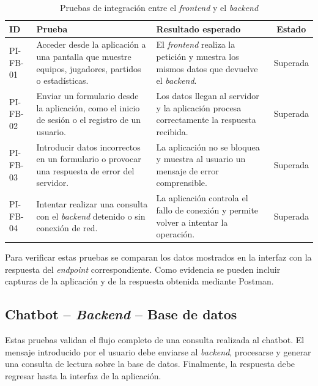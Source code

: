 \begin{table}[H]
    \centering
    \small
    \begin{tabularx}{\textwidth}{|l|X|X|c|}
        \hline
        \textbf{ID} & \textbf{Prueba} & \textbf{Resultado esperado} &
        \textbf{Estado} \\ \hline

        PI-FB-01 &
        Acceder desde la aplicación a una pantalla que muestre equipos,
        jugadores, partidos o estadísticas. &
        El \textit{frontend} realiza la petición y muestra los mismos datos que
        devuelve el \textit{backend}. &
        Superada \\ \hline

        PI-FB-02 &
        Enviar un formulario desde la aplicación, como el inicio de sesión o el
        registro de un usuario. &
        Los datos llegan al servidor y la aplicación procesa correctamente la
        respuesta recibida. &
        Superada \\ \hline

        PI-FB-03 &
        Introducir datos incorrectos en un formulario o provocar una respuesta
        de error del servidor. &
        La aplicación no se bloquea y muestra al usuario un mensaje de error
        comprensible. &
        Superada \\ \hline

        PI-FB-04 &
        Intentar realizar una consulta con el \textit{backend} detenido o sin
        conexión de red. &
        La aplicación controla el fallo de conexión y permite volver a intentar
        la operación. &
        Superada \\ \hline
    \end{tabularx}
    \caption{Pruebas de integración entre el \textit{frontend} y el
    \textit{backend}}
    \label{tab:pruebas-frontend-backend}
\end{table}

Para verificar estas pruebas se comparan los datos mostrados en la interfaz con
la respuesta del \textit{endpoint} correspondiente. Como evidencia se pueden
incluir capturas de la aplicación y de la respuesta obtenida mediante Postman.

\subsection{Chatbot -- \textit{Backend} -- Base de datos}

Estas pruebas validan el flujo completo de una consulta realizada al
chatbot. El mensaje introducido por el usuario debe enviarse al
\textit{backend}, procesarse y generar una consulta de lectura sobre la base de
datos. Finalmente, la respuesta debe regresar hasta la interfaz de la aplicación.

